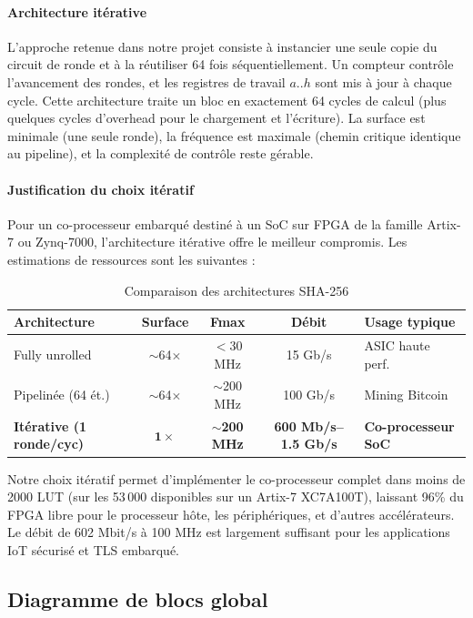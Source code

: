\paragraph{Architecture itérative} L'approche retenue dans notre projet consiste à instancier une seule copie du circuit de ronde et à la réutiliser 64 fois séquentiellement. Un compteur contrôle l'avancement des rondes, et les registres de travail $a..h$ sont mis à jour à chaque cycle. Cette architecture traite un bloc en exactement 64 cycles de calcul (plus quelques cycles d'overhead pour le chargement et l'écriture). La surface est minimale (une seule ronde), la fréquence est maximale (chemin critique identique au pipeline), et la complexité de contrôle reste gérable.

\paragraph{Justification du choix itératif} Pour un co-processeur embarqué destiné à un SoC sur FPGA de la famille Artix-7 ou Zynq-7000, l'architecture itérative offre le meilleur compromis. Les estimations de ressources sont les suivantes :

\begin{table}[H]
\centering
\caption{Comparaison des architectures SHA-256}
\label{tab:archi_compare}
\begin{tabular}{lcccl}
\toprule
\textbf{Architecture} & \textbf{Surface} & \textbf{Fmax} & \textbf{Débit} & \textbf{Usage typique} \\
\midrule
Fully unrolled & $\sim$64$\times$ & $<$30 MHz & 15 Gb/s & ASIC haute perf. \\
Pipelinée (64 ét.) & $\sim$64$\times$ & $\sim$200 MHz & 100 Gb/s & Mining Bitcoin \\
\textbf{Itérative (1 ronde/cyc)} & $\mathbf{1\times}$ & $\sim$\textbf{200 MHz} & \textbf{600 Mb/s--1.5 Gb/s} & \textbf{Co-processeur SoC} \\
\bottomrule
\end{tabular}
\end{table}

Notre choix itératif permet d'implémenter le co-processeur complet dans moins de 2000 LUT (sur les 53\,000 disponibles sur un Artix-7 XC7A100T), laissant 96\% du FPGA libre pour le processeur hôte, les périphériques, et d'autres accélérateurs. Le débit de 602 Mbit/s à 100 MHz est largement suffisant pour les applications IoT sécurisé et TLS embarqué.

\subsection{Diagramme de blocs global}

